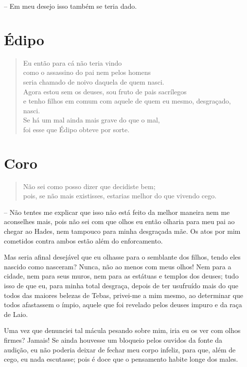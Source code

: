  --   Em meu desejo isso também se teria dado.

\section{Édipo} 

\begin{verse}Eu então para cá não teria vindo\\
como o assassino do pai nem pelos homens\\
seria chamado de noivo daquela de quem nasci.\\
Agora estou sem os deuses, sou fruto de pais sacrílegos\\ 
e tenho filhos em comum com aquele de quem eu mesmo, desgraçado, nasci.\\
Se há um mal ainda mais grave do que o mal,\\
foi esse que Édipo obteve por sorte.
\end{verse}


\section{Coro} 

\begin{verse}Não sei como posso dizer que decidiste bem;\\
pois, se não mais existisses, estarias melhor do que vivendo cego.
\end{verse}

 --    Não tentes me explicar que isso não está feito da melhor maneira
nem me aconselhes mais, pois não sei com que olhos eu então olharia para
meu pai ao chegar ao Hades, nem tampouco para minha desgraçada mãe. Os
atos por mim cometidos contra ambos estão além do enforcamento.

Mas seria afinal desejável que eu olhasse para o semblante dos filhos,
tendo eles nascido como nasceram? Nunca, não ao menos com meus olhos!
Nem para a cidade, nem para seus muros, nem para as estátuas e templos
dos deuses; tudo isso de que eu,  para minha total desgraça,
depois de ter usufruído mais do que todos das maiores belezas de Tebas,
privei-me a mim mesmo, ao determinar que todos afastassem o ímpio,
aquele que foi revelado pelos deuses impuro e da raça de Laio.

Uma vez que denunciei tal mácula pesando sobre mim, iria eu os ver com
olhos firmes? Jamais! Se ainda houvesse um bloqueio pelos ouvidos da
fonte da audição, eu não poderia deixar de fechar meu corpo infeliz,
para que, além de cego, eu nada  escutasse; pois é doce que o
pensamento habite longe dos males.

